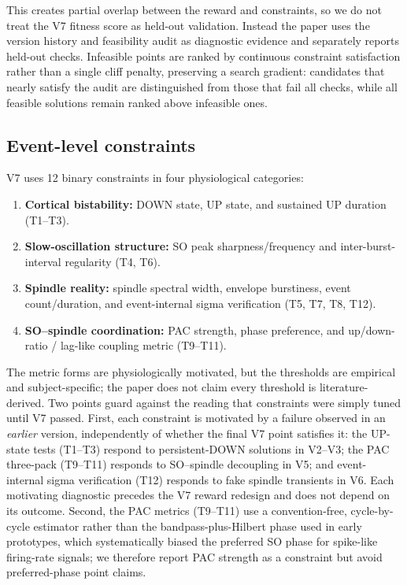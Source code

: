 \documentclass[conference]{IEEEtran}
\begin{document}
This creates partial overlap between the reward and constraints, so we do not
treat the V7 fitness score as held-out validation. Instead the paper uses the
version history and feasibility audit as diagnostic evidence and separately
reports held-out checks. Infeasible points are ranked by continuous constraint
satisfaction rather than a single cliff penalty, preserving a search gradient:
candidates that nearly satisfy the audit are distinguished from those that fail
all checks, while all feasible solutions remain ranked above infeasible ones.

\subsection{Event-level constraints}\label{sec:constraints}
V7 uses 12 binary constraints in four physiological categories:
\begin{enumerate}
\item \textbf{Cortical bistability:} DOWN state, UP state, and sustained UP
duration (T1--T3).
\item \textbf{Slow-oscillation structure:} SO peak sharpness/frequency and
inter-burst-interval regularity (T4, T6).
\item \textbf{Spindle reality:} spindle spectral width, envelope burstiness,
event count/duration, and event-internal sigma verification (T5, T7, T8, T12).
\item \textbf{SO--spindle coordination:} PAC strength, phase preference, and
up/down-ratio / lag-like coupling metric (T9--T11).
\end{enumerate}
The metric forms are physiologically motivated, but the thresholds are
empirical and subject-specific; the paper does not claim every threshold is
literature-derived. Two points guard against the reading that constraints were
simply tuned until V7 passed. First, each constraint is motivated by a failure
observed in an \emph{earlier} version, independently of whether the final V7
point satisfies it: the UP-state tests (T1--T3) respond to persistent-DOWN
solutions in V2--V3; the PAC three-pack (T9--T11) responds to SO--spindle
decoupling in V5; and event-internal sigma verification (T12) responds to fake
spindle transients in V6. Each motivating diagnostic precedes the V7 reward
redesign and does not depend on its outcome. Second, the PAC metrics (T9--T11)
use a convention-free, cycle-by-cycle estimator rather than the
bandpass-plus-Hilbert phase used in early prototypes, which systematically
biased the preferred SO phase for spike-like firing-rate signals; we therefore
report PAC strength as a constraint but avoid preferred-phase point claims.
\end{document}
